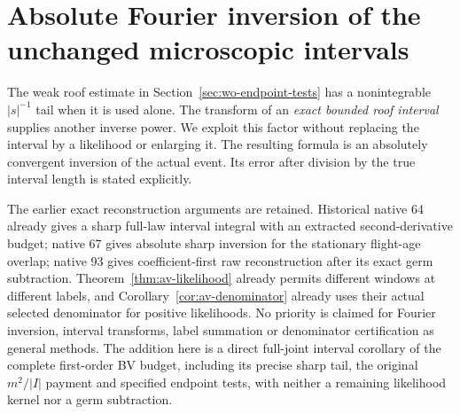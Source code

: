 \section{Absolute Fourier inversion of the unchanged microscopic intervals}
\label{sec:ui-exact}

The weak roof estimate in Section~\ref{sec:wo-endpoint-tests} has a
nonintegrable $|s|^{-1}$ tail when it is used alone.  The transform of an
\emph{exact bounded roof interval} supplies another inverse power.  We
exploit this factor without replacing the interval by a likelihood or
enlarging it.  The resulting formula is an absolutely convergent inversion
of the actual event.  Its error after division by the true interval
length is stated explicitly.

The earlier exact reconstruction arguments are retained. Historical
native 64 already gives a sharp full-law interval integral with an
extracted second-derivative budget; native 67 gives absolute sharp
inversion for the stationary flight-age overlap; native 93 gives
coefficient-first raw reconstruction after its exact germ subtraction.
Theorem~\ref{thm:av-likelihood} already permits different windows
at different labels, and Corollary~\ref{cor:av-denominator} already
uses their actual selected denominator for positive likelihoods.
No priority is claimed for Fourier inversion, interval transforms,
label summation or denominator certification as general methods.
The addition here is a direct full-joint interval corollary of the
complete first-order BV budget, including its precise sharp tail,
the original $m^2/|I|$ payment and specified endpoint tests, with
neither a remaining likelihood kernel nor a germ subtraction.

